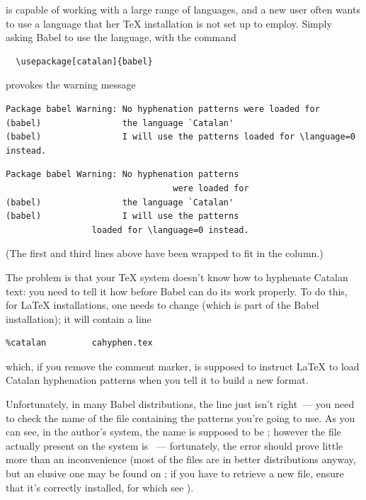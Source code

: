  is capable of working with a large range of
languages, and a new user often wants to use a language that her
\TeX{} installation is not set up to employ.  Simply asking Babel to
use the language, with the command
\begin{verbatim}
  \usepackage[catalan]{babel}
\end{verbatim}
provokes the warning message
\begin{wideversion}
\begin{verbatim}
Package babel Warning: No hyphenation patterns were loaded for
(babel)                the language `Catalan'
(babel)                I will use the patterns loaded for \language=0 instead.
\end{verbatim}
\end{wideversion}
\begin{narrowversion}
\begin{verbatim}
Package babel Warning: No hyphenation patterns
                                 were loaded for
(babel)                the language `Catalan'
(babel)                I will use the patterns
                 loaded for \language=0 instead.
\end{verbatim}
(The first and third lines above have been wrapped to fit in the
column.)
\end{narrowversion}

The problem is that your \TeX{} system doesn't know how to hyphenate
Catalan text: you need to tell it how before Babel can do its work
properly.  To do this, for \LaTeX{} installations, one needs to change
 (which is part of the Babel installation); it will
contain a line
\begin{verbatim}
%catalan         cahyphen.tex
\end{verbatim}
which, if you remove the comment marker, is supposed to instruct
\LaTeX{} to load Catalan hyphenation patterns when you tell it to build
a new format.

Unfortunately, in many Babel distributions, the line just isn't
right~--- you need to check the name of the file containing the
patterns you're going to use.  As you can see, in the author's system,
the name is supposed to be ; however the file
actually present on the system is ~--- fortunately,
the error should prove little more than an inconvenience (most of the
files are in better distributions anyway, but an elusive one
may be found on ; if you have to retrieve
a new file, ensure that it's correctly installed, for which see
).


